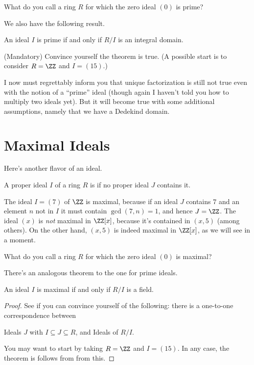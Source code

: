 \begin{exercise}
	What do you call a ring $R$ for which the zero ideal $(0)$ is prime?
\end{exercise}

We also have the following result.
\begin{theorem}
	An ideal $I$ is prime if and only if $R/I$ is an integral domain.
\end{theorem}
\begin{exercise}
	(Mandatory) Convince yourself the theorem is true.
	(A possible start is to consider $R = \ZZ$ and $I = (15)$.)
\end{exercise}

I now must regrettably inform you that unique factorization is still
not true even with the notion of a ``prime'' ideal
(though again I haven't told you how to multiply two ideals yet).
But it will become true with some additional assumptions,
namely that we have a Dedekind domain.

\section{Maximal Ideals}
Here's another flavor of an ideal.
\begin{definition}
	A proper ideal $I$ of a ring $R$ is  if
	no proper ideal $J$ contains it.
\end{definition}
\begin{example}
	\listhack
	\begin{enumerate}[(a)]
		\ii The ideal $I = (7)$ of $\ZZ$ is maximal, because
		if an ideal $J$ contains $7$
		and an element $n$ not in $I$
		it must contain $\gcd(7,n) = 1$, and hence $J = \ZZ$.
		\ii The ideal $(x)$ is \emph{not} maximal in $\ZZ[x]$,
		because it's contained in $(x,5)$ (among others).
		\ii On the other hand, $(x,5)$ is indeed maximal in $\ZZ[x]$,
		as we will see in a moment.
	\end{enumerate}
\end{example}

\begin{exercise}
	What do you call a ring $R$ for which the zero ideal $(0)$ is maximal?
\end{exercise}

There's an analogous theorem to the one for prime ideals.
\begin{theorem}
	An ideal $I$ is maximal if and only if $R/I$ is a field.
\end{theorem}
\begin{proof}
	See if you can convince yourself of the following:
	there is a one-to-one correspondence between
	\begin{enumerate}[(i)]
		\ii Ideals $J$ with $I \subseteq J \subseteq R$, and
		\ii Ideals of $R/I$.
	\end{enumerate}
	You may want to start by taking $R = \ZZ$ and $I = (15)$.
	In any case, the theorem is follows from from this.
\end{proof}

